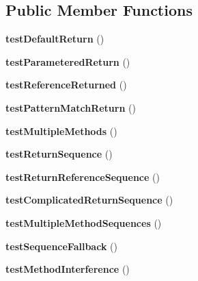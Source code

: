 \subsection*{Public Member Functions}
\begin{DoxyCompactItemize}
\item 
\hypertarget{class_test_of_mock_returns_a3fec7ddfb76e53713a5e40e1809aa6ad}{
{\bfseries testDefaultReturn} ()}
\label{class_test_of_mock_returns_a3fec7ddfb76e53713a5e40e1809aa6ad}

\item 
\hypertarget{class_test_of_mock_returns_af3f1975a7b7ece9a5014f8694c54e99d}{
{\bfseries testParameteredReturn} ()}
\label{class_test_of_mock_returns_af3f1975a7b7ece9a5014f8694c54e99d}

\item 
\hypertarget{class_test_of_mock_returns_acd0b2c3f538deeb648d46a4bb16fe2df}{
{\bfseries testReferenceReturned} ()}
\label{class_test_of_mock_returns_acd0b2c3f538deeb648d46a4bb16fe2df}

\item 
\hypertarget{class_test_of_mock_returns_ad3a7de8c5283bb990d9285c883da8764}{
{\bfseries testPatternMatchReturn} ()}
\label{class_test_of_mock_returns_ad3a7de8c5283bb990d9285c883da8764}

\item 
\hypertarget{class_test_of_mock_returns_aed1225ab7c72888ee0bc91c00473beb5}{
{\bfseries testMultipleMethods} ()}
\label{class_test_of_mock_returns_aed1225ab7c72888ee0bc91c00473beb5}

\item 
\hypertarget{class_test_of_mock_returns_a891563899ec900dfb40fcd294e85b998}{
{\bfseries testReturnSequence} ()}
\label{class_test_of_mock_returns_a891563899ec900dfb40fcd294e85b998}

\item 
\hypertarget{class_test_of_mock_returns_aeaf2aad09bcf9a9333d7131b192d55b1}{
{\bfseries testReturnReferenceSequence} ()}
\label{class_test_of_mock_returns_aeaf2aad09bcf9a9333d7131b192d55b1}

\item 
\hypertarget{class_test_of_mock_returns_aafd27771a15b30eda66e15d332be96e7}{
{\bfseries testComplicatedReturnSequence} ()}
\label{class_test_of_mock_returns_aafd27771a15b30eda66e15d332be96e7}

\item 
\hypertarget{class_test_of_mock_returns_a27987eb0f616a775768afb4c37b9bb0a}{
{\bfseries testMultipleMethodSequences} ()}
\label{class_test_of_mock_returns_a27987eb0f616a775768afb4c37b9bb0a}

\item 
\hypertarget{class_test_of_mock_returns_a8e59d06c5f2f474a4d78c9e80a68b147}{
{\bfseries testSequenceFallback} ()}
\label{class_test_of_mock_returns_a8e59d06c5f2f474a4d78c9e80a68b147}

\item 
\hypertarget{class_test_of_mock_returns_a10d9882fd74cc5841511284dbddc3123}{
{\bfseries testMethodInterference} ()}
\label{class_test_of_mock_returns_a10d9882fd74cc5841511284dbddc3123}

\end{DoxyCompactItemize}


